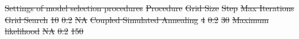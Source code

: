 \documentclass{article}
\providecommand{\DIFdel}[1]{{\protect\color{red}\sout{#1}}}                      %
\providecommand{\DIFdelFL}[1]{\DIFdel{#1}} %
\providecommand{\DIFdelbeginFL}{} %
\newcommand{\DIFscaledelfig}{0.5}
\newlength{\DIFdelgraphicswidth} %
\newlength{\DIFdelgraphicsheight} %
\newcommand{\DIFdelincludegraphics}[2][]{%
\sbox{\DIFdelgraphicsbox}{\DIFOincludegraphics[#1]{#2}}%
\settoboxwidth{\DIFdelgraphicswidth}{\DIFdelgraphicsbox} %
\settoboxtotalheight{\DIFdelgraphicsheight}{\DIFdelgraphicsbox} %
\scalebox{\DIFscaledelfig}{%
\parbox[b]{\DIFdelgraphicswidth}{\usebox{\DIFdelgraphicsbox}\\[-\baselineskip] \rule{\DIFdelgraphicswidth}{0em}}\llap{\resizebox{\DIFdelgraphicswidth}{\DIFdelgraphicsheight}{%
\setlength{\unitlength}{\DIFdelgraphicswidth}%
\begin{picture}(1,1)%
\thicklines\linethickness{2pt} %
{\color[rgb]{1,0,0}\put(0,0){\framebox(1,1){}}}%
{\color[rgb]{1,0,0}\put(0,0){\line( 1,1){1}}}%
{\color[rgb]{1,0,0}\put(0,1){\line(1,-1){1}}}%
\end{picture}%
}\hspace*{3pt}}} %
} %
\DeclareRobustCommand{\DIFdelbeginFL}{\DIFOdelbeginFL \let\includegraphics\DIFdelincludegraphics} %
\begin{document}
\begin{table}[h]
  \centering
  \DIFdelbeginFL %
{%
\DIFdelFL{Settings of model selection procedures}}
\DIFdelFL{Procedure }%
\DIFdelFL{Grid Size }%
\DIFdelFL{Step }%
\DIFdelFL{Max Iterations }%
\DIFdelFL{Grid Search }%
\DIFdelFL{10 }%
\DIFdelFL{0.2 }%
\DIFdelFL{NA }%
\DIFdelFL{Coupled Simulated Annealing }%
\DIFdelFL{4 }%
\DIFdelFL{0.2 }%
\DIFdelFL{30 }%
\DIFdelFL{Maximum likelihood }%
\DIFdelFL{NA }%
\DIFdelFL{0.2 }%
\DIFdelFL{150}%


\end{table}
\end{document}
